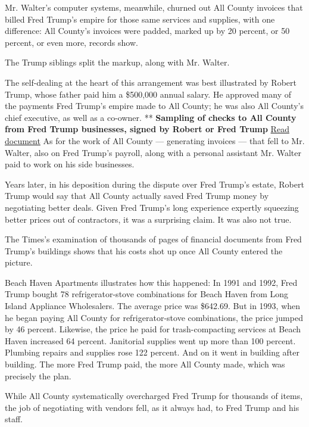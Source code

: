 Mr. Walter's computer systems, meanwhile, churned out All County
invoices that billed Fred Trump's empire for those same services and
supplies, with one difference: All County's invoices were padded, marked
up by 20 percent, or 50 percent, or even more, records show.

The Trump siblings split the markup, along with Mr. Walter.

The self-dealing at the heart of this arrangement was best illustrated
by Robert Trump, whose father paid him a \$500,000 annual salary. He
approved many of the payments Fred Trump's empire made to All County; he
was also All County's chief executive, as well as a co-owner. **
\textbf{Sampling of checks to All County from Fred Trump businesses,
signed by Robert or Fred Trump}
\href{https://int.graylady3jvrrxbe.onion/data/documenthelper/138-all-county-checks/76fe49efb6b1ae8eabe3/optimized/full.pdf\#page=1}{Read
document} As for the work of All County --- generating invoices --- that
fell to Mr. Walter, also on Fred Trump's payroll, along with a personal
assistant Mr. Walter paid to work on his side businesses.

Years later, in his deposition during the dispute over Fred Trump's
estate, Robert Trump would say that All County actually saved Fred Trump
money by negotiating better deals. Given Fred Trump's long experience
expertly squeezing better prices out of contractors, it was a surprising
claim. It was also not true.

The Times's examination of thousands of pages of financial documents
from Fred Trump's buildings shows that his costs shot up once All County
entered the picture.

Beach Haven Apartments illustrates how this happened: In 1991 and 1992,
Fred Trump bought 78 refrigerator-stove combinations for Beach Haven
from Long Island Appliance Wholesalers. The average price was \$642.69.
But in 1993, when he began paying All County for refrigerator-stove
combinations, the price jumped by 46 percent. Likewise, the price he
paid for trash-compacting services at Beach Haven increased 64 percent.
Janitorial supplies went up more than 100 percent. Plumbing repairs and
supplies rose 122 percent. And on it went in building after building.
The more Fred Trump paid, the more All County made, which was precisely
the plan.

While All County systematically overcharged Fred Trump for thousands of
items, the job of negotiating with vendors fell, as it always had, to
Fred Trump and his staff.

